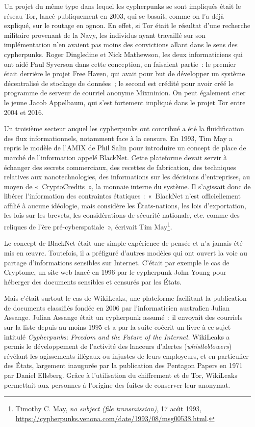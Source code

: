 \documentclass[
  a5paper,
  smalldemyvopaper,10pt,twoside,onecolumn,openright,extrafontsizes,hidelinks]{memoir}
\begin{document}
Un projet du même type dans lequel les cypherpunks se sont impliqués
était le réseau Tor, lancé publiquement en 2003, qui se basait, comme on
l'a déjà expliqué, sur le routage en ognon. En effet, si Tor était le
résultat d'une recherche militaire provenant de la Navy, les individus
ayant travaillé sur son implémentation n'en avaient pas moins des
convictions allant dans le sens des cypherpunks. Roger Dingledine et
Nick Mathewson, les deux informaticiens qui ont aidé Paul Syverson dans
cette conception, en faisaient partie~: le premier était derrière le
projet Free Haven, qui avait pour but de développer un système
décentralisé de stockage de données~; le second est crédité pour avoir
créé le programme de serveur de courriel anonyme Mixminion. On peut
également citer le jeune Jacob Appelbaum, qui s'est fortement impliqué
dans le projet Tor entre 2004 et 2016.

Un troisième secteur auquel les cypherpunks ont contribué a été la
fluidification des flux informationnels, notamment face à la censure. En
1993, Tim May a repris le modèle de l'AMIX de Phil Salin pour introduire
un concept de place de marché de l'information appelé BlackNet. Cette
plateforme devait servir à échanger des secrets commerciaux, des
recettes de fabrication, des techniques relatives aux nanotechnologies,
des informations sur les décisions d'entreprises, au moyen de
«~CryptoCredits~», la monnaie interne du système. Il s'agissait donc de
libérer l'information des contraintes étatiques~: «~BlackNet n'est
officiellement affilié à aucune idéologie, mais considère les
États-nations, les lois d'exportation, les lois sur les brevets, les
considérations de sécurité nationale, etc. comme des reliques de l'ère
pré-cyberspatiale~», écrivait Tim May\footnote{Timothy C. May, \emph{no
  subject (file transmission)}, 17 août 1993,
  \url{https://cypherpunks.venona.com/date/1993/08/msg00538.html}.}.

Le concept de BlackNet était une simple expérience de pensée et n'a
jamais été mis en œuvre. Toutefois, il a préfiguré d'autres modèles qui
ont ouvert la voie au partage d'informations sensibles sur Internet.
C'était par exemple le cas de Cryptome, un site web lancé en 1996 par le
cypherpunk John Young pour héberger des documents sensibles et censurés
par les États.

Mais c'était surtout le cas de WikiLeaks, une plateforme facilitant la
publication de documents classifiés fondée en 2006 par l'informaticien
australien Julian Assange. Julian Assange était un cypherpunk assumé~:
il envoyait des courriels sur la liste depuis au moins 1995 et a par la
suite coécrit un livre à ce sujet intitulé \emph{Cypherpunks: Freedom
and the Future of the Internet}. WikiLeaks a permis le développement de
l'activité des lanceurs d'alertes (\emph{whistleblowers}) révélant les
agissements illégaux ou injustes de leurs employeurs, et en particulier
des États, largement inaugurée par la publication des Pentagon Papers en
1971 par Daniel Ellsberg. Grâce à l'utilisation du chiffrement et de
Tor, WikiLeaks permettait aux personnes à l'origine des fuites de
conserver leur anonymat.
\end{document}
